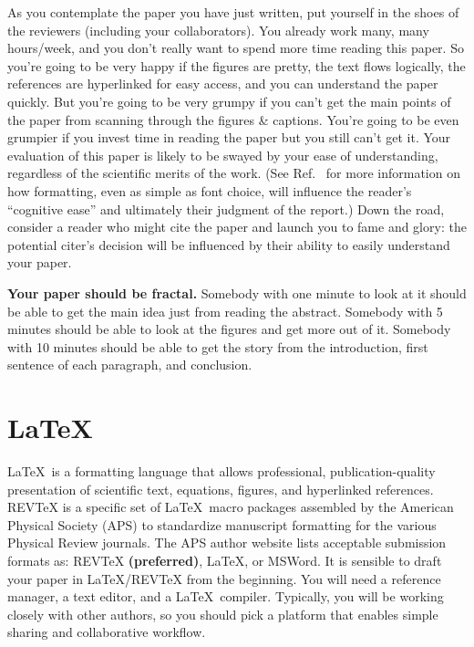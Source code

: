 \documentclass[aps,prb,twocolumn,superscriptaddress,floatfix,longbibliography]{revtex4-2}
\newif\ifptitle
\newif\ifpnumber
\newcounter{para}
\newcommand\ptitle[1]{\par\refstepcounter{para}
{\ifpnumber{\noindent\textcolor{lightgray}{\textbf{\thepara}}\indent}\fi}
{\ifptitle{\textbf{[{#1}]}}\fi}}
\begin{document}
\ptitle{Formatting matters} As you contemplate the paper you have just written, put yourself in the shoes of the reviewers (including your collaborators). You already work many, many hours/week, and you don't really want to spend more time reading this paper. So you're going to be very happy if the figures are pretty, the text flows logically, the references are hyperlinked for easy access, and you can understand the paper quickly. But you're going to be very grumpy if you can't get the main points of the paper from scanning through the figures \& captions. You're going to be even grumpier if you invest time in reading the paper but you still can't get it. Your evaluation of this paper is likely to be swayed by your ease of understanding, regardless of the scientific merits of the work. (See Ref.\  for more information on how formatting, even as simple as font choice, will influence the reader's ``cognitive ease'' and ultimately their judgment of the report.) Down the road, consider a reader who might cite the paper and launch you to fame and glory: the potential citer's decision will be influenced by their ability to easily understand your paper.

\ptitle{Fractal} \textbf{Your paper should be fractal.} Somebody with one minute to look at it should be able to get the main idea just from reading the abstract. Somebody with 5 minutes should be able to look at the figures and get more out of it. Somebody with 10 minutes should be able to get the story from the introduction, first sentence of each paragraph, and conclusion.

\section{\label{sec:LaTeX}\LaTeX}

\ptitle{Intro to \LaTeX} \LaTeX\ is a formatting language that allows professional, publication-quality presentation of scientific text, equations, figures, and hyperlinked references. REVTeX is a specific set of \LaTeX\ macro packages assembled by the American Physical Society (APS) to standardize manuscript formatting for the various Physical Review journals. The APS author website \cite{PhysicalReview} lists acceptable submission formats as: REVTeX \textbf{(preferred)}, \LaTeX, or MSWord. It is sensible to draft your paper in \LaTeX/REVTeX from the beginning. You will need a reference manager, a text editor, and a \LaTeX\ compiler. Typically, you will be working closely with other authors, so you should pick a platform that enables simple sharing and collaborative workflow.
\end{document}
